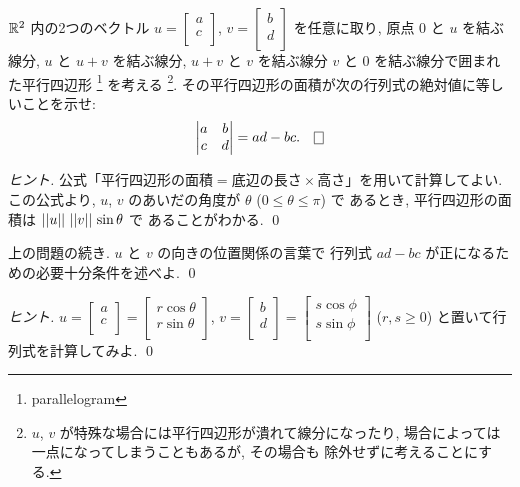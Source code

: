 \documentclass[12pt,twoside]{jarticle}
\begin{document}
\begin{question}[平行四辺形の面積]
  \label{q:|det|=Area}
  ${\mathbb R}^2$ 内の2つのベクトル $u=
  \begin{bmatrix}
    a \\
    c \\
  \end{bmatrix}$, $v=
  \begin{bmatrix}
    b \\
    d \\
  \end{bmatrix}$ を任意に取り, 
  原点 $0$ と $u$ を結ぶ線分, $u$ と $u+v$ を結ぶ線分, $u+v$ と $v$ 
  を結ぶ線分 $v$ と $0$ を結ぶ線分で囲まれた平行四辺形%
  \footnote{parallelogram}%
  を考える%
  \footnote{$u$, $v$ が特殊な場合には平行四辺形が潰れて線分になったり,
    場合によっては一点になってしまうこともあるが, その場合も
    除外せずに考えることにする.}.
  その平行四辺形の面積が次の行列式の絶対値に等しいことを示せ:
  \begin{equation*}
    \begin{vmatrix}
      a & b \\ 
      c & d \\
    \end{vmatrix}
    = ad - bc.
    \qed
  \end{equation*}
\end{question}

\begin{proof}[ヒント]
  公式「\(
    \text{平行四辺形の面積} =
    \text{底辺の長さ}\times\text{高さ}
  \)」を用いて計算してよい.  
  この公式より, $u$, $v$ のあいだの角度が $\theta$ ($0\le\theta\le\pi$) で
  あるとき, 平行四辺形の面積は $\left|\left|u\right|\right|\,\left|\left|v\right|\right|\,\sin\theta$ で
  あることがわかる. 
  \qed
\end{proof}


\begin{question}
  \label{q:orientation-2x2}
  上の問題の続き.  $u$ と $v$ の向きの位置関係の言葉で
  行列式 $ad-bc$ が正になるための必要十分条件を述べよ.
  \qed
\end{question}

\begin{proof}[ヒント]
  $u=
  \begin{bmatrix}
    a \\
    c \\
  \end{bmatrix}=
  \begin{bmatrix}
    r\cos\theta \\
    r\sin\theta \\
  \end{bmatrix}
  $, $v=
  \begin{bmatrix}
    b \\
    d \\
  \end{bmatrix}=
  \begin{bmatrix}
    s\cos\phi \\
    s\sin\phi \\
  \end{bmatrix}$  ($r,s\ge 0$) と置いて行列式を計算してみよ.  
  \qed
\end{proof}
\end{document}
